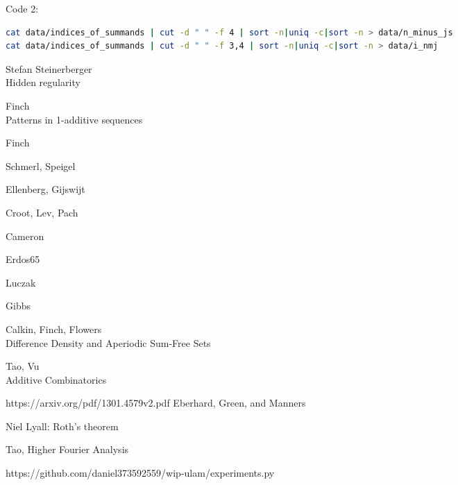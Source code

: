 \documentclass{article}
\theoremstyle{definition}
\theoremstyle{remark}
\numberwithin{equation}{section}
\begin{document}
{Code 2: 

\begin{lstlisting}[language=Bash]
cat data/indices_of_summands | cut -d " " -f 4 | sort -n|uniq -c|sort -n > data/n_minus_js
cat data/indices_of_summands | cut -d " " -f 3,4 | sort -n|uniq -c|sort -n > data/i_nmj
\end{lstlisting}

\begin{thebibliography}{9}
Stefan Steinerberger\\
Hidden regularity

Finch\\
Patterns in 1-additive sequences
 
Finch
 
Schmerl, Speigel
 
Ellenberg, Gijswijt

Croot, Lev, Pach

Cameron

Erdos65

Luczak

Gibbs

Calkin, Finch, Flowers\\
Difference Density and Aperiodic Sum-Free Sets 

Tao, Vu\\
Additive Combinatorics

  https://arxiv.org/pdf/1301.4579v2.pdf Eberhard, Green, and Manners

  Niel Lyall: Roth's theorem 

  Tao, Higher Fourier Analysis

  https://github.com/daniel373592559/wip-ulam/experiments.py

\end{thebibliography}}
\end{document}
